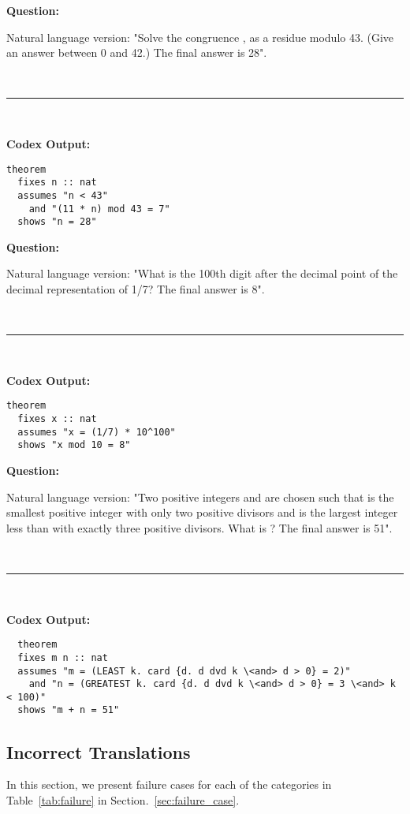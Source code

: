 \documentclass{article}
\begin{document}
\begin{boxB}
\textbf{Question:}

Natural language version: "Solve the congruence , as a residue modulo 43.  
(Give an answer between 0 and 42.) The final answer is 28".

\
\hrule
\

\textbf{Codex Output:}
\begin{lstlisting}
theorem
  fixes n :: nat
  assumes "n < 43"
    and "(11 * n) mod 43 = 7"
  shows "n = 28"
\end{lstlisting}
\end{boxB}




\begin{boxB}
\textbf{Question:}

Natural language version: "What is the 100th digit after the decimal 
point of the decimal representation of 1/7? The final answer is 8".

\
\hrule
\

\textbf{Codex Output:}
\begin{lstlisting}
theorem
  fixes x :: nat
  assumes "x = (1/7) * 10^100"
  shows "x mod 10 = 8"
\end{lstlisting}
\end{boxB}



\begin{boxB}
\textbf{Question:}

Natural language version: "Two positive integers  and  
are chosen such that  is the smallest positive integer with 
only two positive divisors and  is the largest integer less than  with exactly three positive divisors. What is ? The final answer is 51".

\
\hrule
\
 
\textbf{Codex Output:}
\begin{lstlisting}
  theorem
  fixes m n :: nat
  assumes "m = (LEAST k. card {d. d dvd k \<and> d > 0} = 2)"
    and "n = (GREATEST k. card {d. d dvd k \<and> d > 0} = 3 \<and> k < 100)"
  shows "m + n = 51"  
\end{lstlisting}
\end{boxB}

\newpage
\subsection{Incorrect Translations}

In this section, we present failure cases for each of the categories in Table~\ref{tab:failure} in Section.~\ref{sec:failure_case}.
\end{document}
